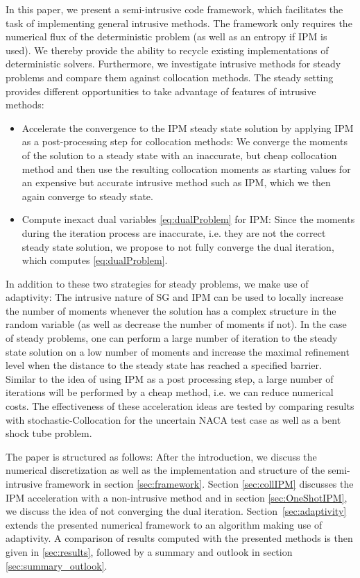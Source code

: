 In this paper, we present a semi-intrusive code framework, which facilitates the task of implementing general intrusive methods. The framework only requires the numerical flux of the deterministic problem (as well as an entropy if IPM is used). We thereby provide the ability to recycle existing implementations of deterministic solvers.
Furthermore, we investigate intrusive methods for steady problems and compare them against collocation methods. The steady setting provides different opportunities to take advantage of features of intrusive methods: 
\begin{itemize}
\item Accelerate the convergence to the IPM steady state solution by applying IPM as a post-processing step for collocation methods: We converge the moments of the solution to a steady state with an inaccurate, but cheap collocation method and then use the resulting collocation moments as starting values for an expensive but accurate intrusive method such as IPM, which we then again converge to steady state. 
\item Compute inexact dual variables \eqref{eq:dualProblem} for IPM: Since the moments during the iteration process are inaccurate, i.e. they are not the correct steady state solution, we propose to not fully converge the dual iteration, which computes \eqref{eq:dualProblem}. 
\end{itemize}
In addition to these two strategies for steady problems, we make use of adaptivity: The intrusive nature of SG and IPM can be used to locally increase the number of moments whenever the solution has a complex structure in the random variable (as well as decrease the number of moments if not). In the case of steady problems, one can perform a large number of iteration to the steady state solution on a low number of moments and increase the maximal refinement level when the distance to the steady state has reached a specified barrier. Similar to the idea of using IPM as a post processing step, a large number of iterations will be performed by a cheap method, i.e. we can reduce numerical costs. The effectiveness of these acceleration ideas are tested by comparing results with stochastic-Collocation for the uncertain NACA test case as well as a bent shock tube problem. 

The paper is structured as follows: After the introduction, we discuss the numerical discretization as well as the implementation and structure of the semi-intrusive framework in section \ref{sec:framework}. Section \ref{sec:collIPM} discusses the IPM acceleration with a non-intrusive method and in section \ref{sec:OneShotIPM}, we discuss the idea of not converging the dual iteration. Section~\ref{sec:adaptivity} extends the presented numerical framework to an algorithm making use of adaptivity. A comparison of results computed with the presented methods is then given in \ref{sec:results}, followed by a summary and outlook in section \ref{sec:summary_outlook}.

